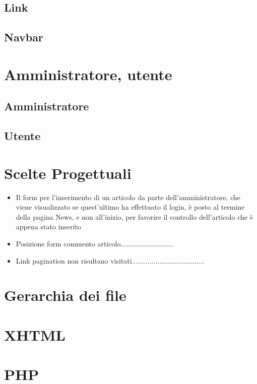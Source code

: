 \documentclass[10pt, a4paper]{article}
\begin{document}
\subsection{Link}

\subsection{Navbar}

\section{Amministratore, utente}

\subsection{Amministratore}

\subsection{Utente}

\section{Scelte Progettuali}
\begin{itemize}
	\item{Il form per l'inserimento di un articolo da parte dell'amministratore, che viene visualizzato se quest'ultimo ha effettuato il login, è posto al termine della pagina News, e non all'inizio, per favorire il controllo dell'articolo che è appena stato inserito}
	\item{Posizione form commento articolo...........................}
	\item{Link pagination non risultano visitati.....................................}
\end{itemize}

\section{Gerarchia dei file}

\section{XHTML}

\section{PHP}
\end{document}
